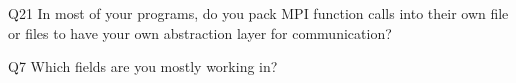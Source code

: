 \begin{description}%
\item{Q21} In most of your programs, do you pack MPI function calls into their own file or files to have your own abstraction layer for communication?%
\item{Q7} Which fields are you mostly working in?%
\end{description}%
